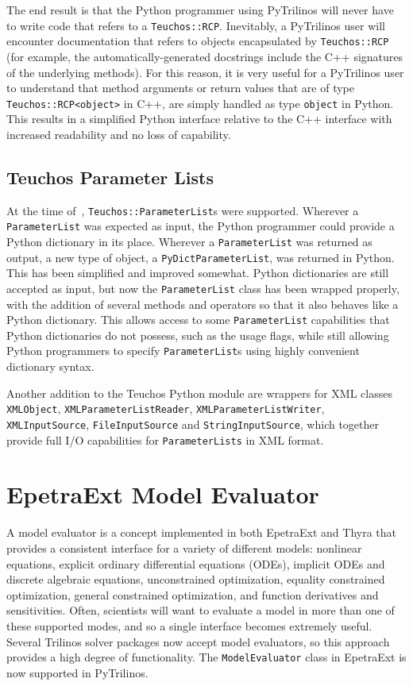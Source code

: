 \documentclass[11pt]{article}
\begin{document}
The end result is that the Python programmer using PyTrilinos will never have to write code that refers to a {\tt Teuchos::RCP}.  Inevitably, a PyTrilinos user will encounter documentation that refers to objects encapsulated by {\tt Teuchos::RCP} (for example, the automatically-generated docstrings include the C++ signatures of the underlying methods).  For this reason, it is very useful for a PyTrilinos user to understand that method arguments or return values that are of type {\tt Teuchos::RCP<object>} in C++, are simply handled as type {\tt object} in Python.  This results in a simplified Python interface relative to the C++ interface with increased readability and no loss of capability.

\subsection{Teuchos Parameter Lists}
\label{sec:teuchos_parameterlists}

At the time of~\cite{PyTrilinos}, {\tt Teuchos::ParameterList}s were supported.  Wherever a {\tt ParameterList} was expected as input, the Python programmer could provide a Python dictionary in its place.  Wherever a {\tt ParameterList} was returned as output, a new type of object, a {\tt PyDictParameterList}, was returned in Python.  This has been simplified and improved somewhat.  Python dictionaries are still accepted as input, but now the {\tt ParameterList} class has been wrapped properly, with the addition of several methods and operators so that it also behaves like a Python dictionary.  This allows access to some {\tt ParameterList} capabilities that Python dictionaries do not possess, such as the usage flags, while still allowing Python programmers to specify {\tt ParameterList}s using highly convenient dictionary syntax.

Another addition to the Teuchos Python module are wrappers for XML classes {\tt XMLObject}, {\tt XMLPa\-rameterListReader}, {\tt XMLParameterListWriter}, {\tt XMLInputSource}, {\tt FileInputSource} and {\tt String\-InputSource}, which together provide full I/O capabilities for {\tt ParameterLists} in XML format.

\section{EpetraExt Model Evaluator}
\label{sec:modelevaluator}

A model evaluator is a concept implemented in both EpetraExt and Thyra that provides a consistent interface for a variety of different models: nonlinear equations, explicit ordinary differential equations (ODEs), implicit ODEs and discrete algebraic equations, unconstrained optimization, equality constrained optimization, general constrained optimization, and function derivatives and sensitivities.  Often, scientists will want to evaluate a model in more than one of these supported modes, and so a single interface becomes extremely useful.  Several Trilinos solver packages now accept model evaluators, so this approach provides a high degree of functionality.  The {\tt ModelEvaluator} class in EpetraExt is now supported in PyTrilinos.
\end{document}
